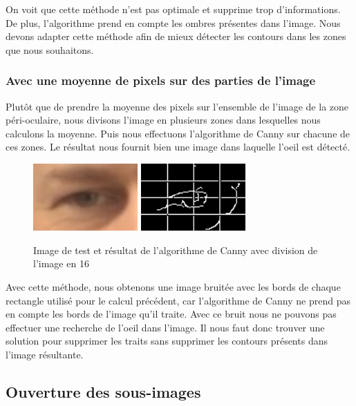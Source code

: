 On voit que cette méthode n'est pas optimale et supprime trop d'informations. De plus,
l'algorithme prend en compte les ombres présentes dans l'image. Nous devons adapter cette méthode
afin de mieux détecter les contours dans les zones que nous souhaitons.

\subsubsection{Avec une moyenne de pixels sur des parties de l'image}

Plutôt que de prendre la moyenne des pixels sur l'ensemble de l'image de la zone péri-oculaire, nous divisons l'image
en plusieurs zones dans lesquelles nous calculons la moyenne. Puis nous effectuons l'algorithme
de Canny sur chacune de ces zones. Le résultat nous fournit bien une image dans laquelle l'oeil
est détecté.

\begin{figure}[H]
 \center
 \includegraphics[width=4cm]{image/original.png}
 \includegraphics[width=4cm]{image/canny_decomposition.png}
 \caption{Image de test et résultat de l'algorithme de Canny avec division de l'image en 16}
\end{figure}

Avec cette méthode, nous obtenons une image bruitée avec les bords de chaque rectangle utilisé
pour le calcul précédent, car l'algorithme de Canny ne prend pas en compte les bords de l'image
qu'il traite. Avec ce bruit nous ne pouvons pas effectuer une recherche de l'oeil dans
l'image. Il nous faut donc trouver une solution pour supprimer les traits
sans supprimer les contours présents dans l'image résultante.

\subsection{Ouverture des sous-images}

